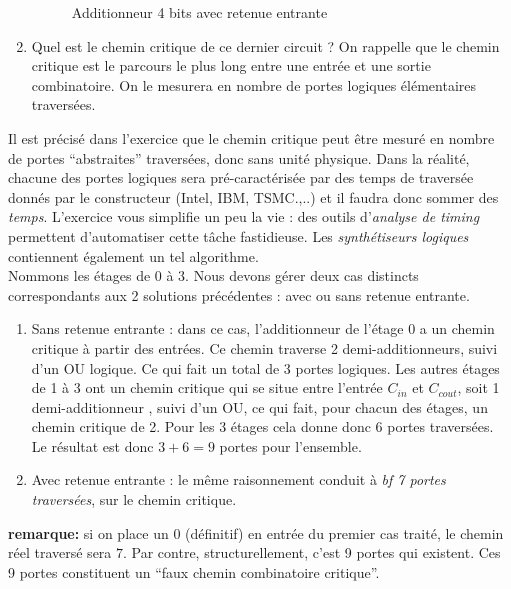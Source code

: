 \documentclass[a4paper,11pt]{article}
\begin{document}
\begin{enumerate}
\begin{figure}[!h]
  \centering
  \caption{Additionneur 4 bits avec retenue entrante}
  \label{fa}
\end{figure}

\item Quel est le chemin critique de ce dernier circuit ? On rappelle que le chemin critique est le parcours le plus long entre une entrée et une sortie combinatoire. On le mesurera en nombre de portes logiques élémentaires traversées.
\end{enumerate}

\begin{cadre}
  Il est précisé dans l'exercice que le chemin critique peut être mesuré en nombre de portes ``abstraites'' traversées, donc sans unité physique. Dans la réalité, chacune des portes logiques sera pré-caractérisée par des temps de traversée donnés par le constructeur (Intel, IBM, TSMC.,..) et il faudra donc sommer des {\it temps}. L'exercice vous simplifie un peu la vie : des outils d'{\it analyse de timing} permettent d'automatiser cette tâche fastidieuse. Les {\it synthétiseurs logiques} contiennent également un tel algorithme.\\

Nommons les étages de 0 à 3. Nous devons gérer deux cas distincts correspondants aux 2 solutions précédentes : avec ou sans retenue entrante.
  \begin{enumerate}
    \item Sans retenue entrante : dans ce cas, l'additionneur de l'étage 0 a un chemin critique à partir des entrées. Ce chemin traverse 2 demi-additionneurs, suivi d'un OU logique. Ce qui fait un total de 3 portes logiques. Les autres étages de 1 à 3 ont un chemin critique qui se situe entre l'entrée $C_{in}$ et $C_{cout}$, soit 1 demi-additionneur , suivi d'un OU, ce qui fait, pour chacun des étages, un chemin critique de 2. Pour les 3 étages cela donne donc 6 portes traversées. Le résultat est donc {\bf $3+6=9$} portes pour l'ensemble.
   \item Avec retenue entrante : le même raisonnement conduit à {\it bf 7 portes traversées}, sur le chemin critique.  
  \end{enumerate}

{\bf remarque:} si on place un $0$ (définitif) en entrée du premier cas traité, le chemin réel traversé sera $7$. Par contre, structurellement, c'est 9 portes qui existent. Ces 9 portes constituent un ``faux chemin combinatoire critique''.
\end{cadre}
\end{document}
